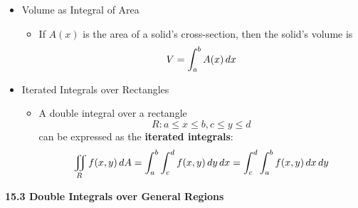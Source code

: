   \begin{itemize}

  \item Volume as Integral of Area

    \begin{itemize}
    \item If $A(x)$ is the area of a solid's cross-section, then the solid's volume is
      \[
        V  = \int_a^b A(x)\,d{x}
      \]
    \end{itemize}
  
  \item Iterated Integrals over Rectangles
  
    \begin{itemize}
    \item A double integral over a rectangle
      \[
        R: a\leq x\leq b, c\leq y\leq d
      \]
        can be expressed as the \textbf{iterated integrals}:
      \[
        \iint_R f(x,y)\,d{A} = \int_a^b\int_c^d f(x,y)\,d{y}\,d{x} = \int_c^d\int_a^b f(x,y)\,d{x}\,d{y}
      \]
    \end{itemize}
    
  
    
  \end{itemize}
  
  \newpage
  
  \centerline{\bf 15.3 Double Integrals over General Regions}
  
